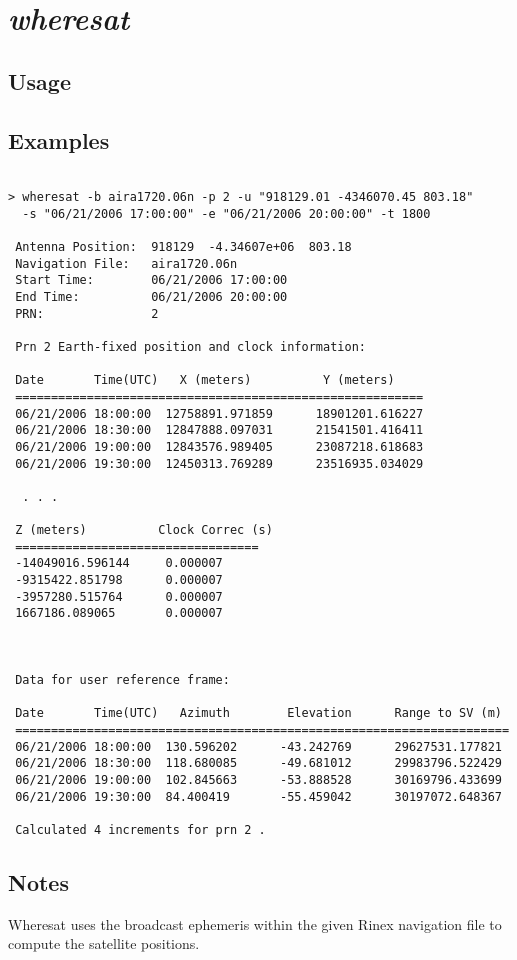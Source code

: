 \section{\emph{wheresat}}
\subsection{Usage}
\subsection{Examples}
\begin{Verbatim}

> wheresat -b aira1720.06n -p 2 -u "918129.01 -4346070.45 803.18" 
  -s "06/21/2006 17:00:00" -e "06/21/2006 20:00:00" -t 1800 

 Antenna Position:  918129  -4.34607e+06  803.18
 Navigation File:   aira1720.06n
 Start Time:        06/21/2006 17:00:00
 End Time:          06/21/2006 20:00:00
 PRN:               2

 Prn 2 Earth-fixed position and clock information:

 Date       Time(UTC)   X (meters)          Y (meters)
 =========================================================
 06/21/2006 18:00:00  12758891.971859      18901201.616227
 06/21/2006 18:30:00  12847888.097031      21541501.416411
 06/21/2006 19:00:00  12843576.989405      23087218.618683
 06/21/2006 19:30:00  12450313.769289      23516935.034029

  . . .

 Z (meters)          Clock Correc (s)
 ==================================
 -14049016.596144     0.000007
 -9315422.851798      0.000007
 -3957280.515764      0.000007
 1667186.089065       0.000007



 Data for user reference frame:

 Date       Time(UTC)   Azimuth        Elevation      Range to SV (m)
 =====================================================================
 06/21/2006 18:00:00  130.596202      -43.242769      29627531.177821
 06/21/2006 18:30:00  118.680085      -49.681012      29983796.522429
 06/21/2006 19:00:00  102.845663      -53.888528      30169796.433699
 06/21/2006 19:30:00  84.400419       -55.459042      30197072.648367

 Calculated 4 increments for prn 2 .

\end{Verbatim}
\subsection{Notes}
Wheresat uses the broadcast ephemeris within the given Rinex navigation file to compute the satellite positions.
